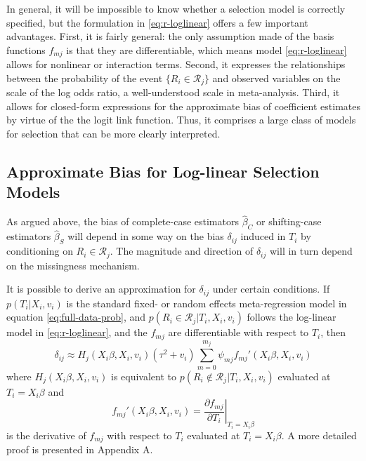 \documentclass[
]{article}
\begin{document}
In general, it will be impossible to know whether a selection model is correctly specified, but the formulation in \eqref{eq:r-loglinear} offers a few important advantages.
First, it is fairly general: the only assumption made of the basis functions \(f_{mj}\) is that they are differentiable, which means model \eqref{eq:r-loglinear} allows for nonlinear or interaction terms.
Second, it expresses the relationships between the probability of the event \(\{R_i \in \mathcal{R}_j\}\) and observed variables on the scale of the log odds ratio, a well-understood scale in meta-analysis.
Third, it allows for closed-form expressions for the approximate bias of coefficient estimates by virtue of the the logit link function.
Thus, it comprises a large class of models for selection that can be more clearly interpreted.

\hypertarget{approximate-bias-for-log-linear-selection-models}{%
\subsection{Approximate Bias for Log-linear Selection Models}\label{approximate-bias-for-log-linear-selection-models}}

As argued above, the bias of complete-case estimators \(\hat{\beta}_C\) or shifting-case estimators \(\hat{\beta}_S\) will depend in some way on the bias \(\delta_{ij}\) induced in \(T_i\) by conditioning on \(R_i \in \mathcal{R}_j\).
The magnitude and direction of \(\delta_{ij}\) will in turn depend on the missingness mechanism.

It is possible to derive an approximation for \(\delta_{ij}\) under certain conditions.
If \(p(T_i | X_i, v_i)\) is the standard fixed- or random effects meta-regression model in equation \eqref{eq:full-data-prob}, and \(p(R_i \in \mathcal{R}_j | T_i, X_i, v_i)\) follows the log-linear model in \eqref{eq:r-loglinear}, and the \(f_{mj}\) are differentiable with respect to \(T_i\), then
\begin{equation}
\delta_{ij} \approx H_j(X_i \beta, X_i, v_i)(\tau^2 + v_i)\sum_{m = 0}^{m_j} \psi_{mj} f_{mj}'(X_i \beta, X_i, v_i)
\label{eq:conditional-bias}
\end{equation}
where \(H_j(X_i \beta, X_i, v_i)\) is equivalent to \(p(R_i \not\in \mathcal{R}_j | T_i, X_i, v_i)\) evaluated at \(T_i = X_i\beta\) and
\[
f_{mj}'(X_i\beta, X_i, v_i) = \left.\frac{\partial f_{mj}}{\partial T_i}\right\rvert_{T_i = X_i\beta}
\]
is the derivative of \(f_{mj}\) with respect to \(T_i\) evaluated at \(T_i = X_i\beta\).
A more detailed proof is presented in Appendix A.
\end{document}
